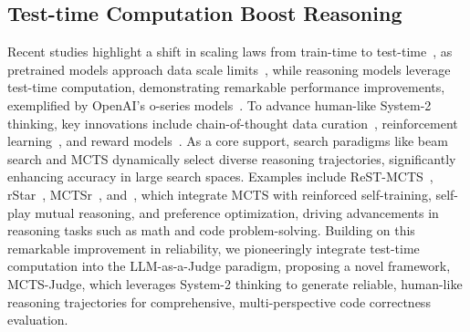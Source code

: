 \subsection{Test-time Computation Boost Reasoning}
Recent studies highlight a shift in scaling laws from train-time to test-time~\cite{ji2025test, xu2025towards}, as pretrained models approach data scale limits~\cite{snell2024scaling}, while reasoning models leverage test-time computation, demonstrating remarkable performance improvements, exemplified by OpenAI's o-series models~\cite{jaech2024openai}.
To advance human-like System-2 thinking, key innovations include chain-of-thought data curation~\cite{wang2022self, wang2024strategic}, reinforcement learning~\cite{deepseek2025r1, qwen2024technical}, and reward models~\cite{guan2025rstar, yu2024self}.
As a core support, search paradigms like beam search and MCTS dynamically select diverse reasoning trajectories, significantly enhancing accuracy in large search spaces. Examples include ReST-MCTS~\cite{zhang2024rest}, rStar~\cite{qi2024mutual}, MCTSr~\cite{zhang2024accessing}, and~\cite{xie2024monte}, which integrate MCTS with reinforced self-training, self-play mutual reasoning, and preference optimization, driving advancements in reasoning tasks such as math and code problem-solving.
Building on this remarkable improvement in reliability, we pioneeringly integrate test-time computation into the LLM-as-a-Judge paradigm, proposing a novel framework, MCTS-Judge, which leverages System-2 thinking to generate reliable, human-like reasoning trajectories for comprehensive, multi-perspective code correctness evaluation.
